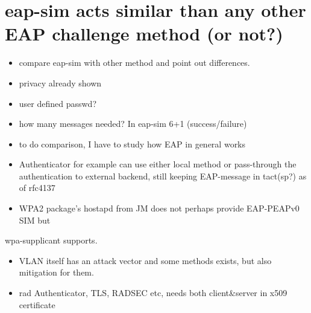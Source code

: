 \documentclass[12pt,a4paper,english]{tutthesis}
\begin{document}
\section{eap-sim acts similar than any other EAP challenge method (or not?)}
\label{sec-8-5}
\begin{itemize}
\item compare eap-sim with other method and point out differences.
\item privacy already shown
\item user defined passwd?
\item how many messages needed? In eap-sim 6+1 (success/failure)
\item to do comparison, I have to study how EAP in general works
\item Authenticator for example can use either local method or
pass-through the authentication to external backend, still keeping
EAP-message in tact(sp?) as of  rfc4137
\item WPA2 package's hostapd from JM does not perhaps provide EAP-PEAPv0 SIM but
\end{itemize}
wpa-supplicant supports.
\begin{itemize}
\item VLAN itself has an attack vector and some methods exists, but also
mitigation for them.
\item rad Authenticator, TLS, RADSEC etc, needs both client\&server in
x509 certificate
\end{itemize}
\end{document}
